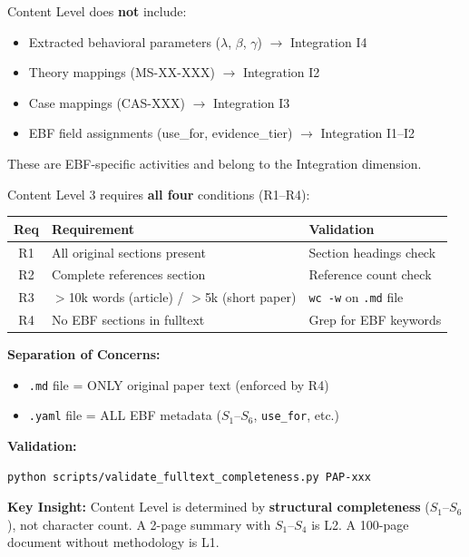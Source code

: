 \begin{tcolorbox}[colback=yellow!5!white, colframe=yellow!75!black,
    title=Note: What Content Level Does NOT Include]
Content Level does \textbf{not} include:
\begin{itemize}[nosep]
    \item Extracted behavioral parameters ($\lambda$, $\beta$, $\gamma$) $\rightarrow$ Integration I4
    \item Theory mappings (MS-XX-XXX) $\rightarrow$ Integration I2
    \item Case mappings (CAS-XXX) $\rightarrow$ Integration I3
    \item EBF field assignments (use\_for, evidence\_tier) $\rightarrow$ Integration I1--I2
\end{itemize}
These are EBF-specific activities and belong to the Integration dimension.
\end{tcolorbox}

\begin{tcolorbox}[colback=red!5!white, colframe=red!75!black,
    title=Critical: Content Level 3 Requirements (R1--R4)]
Content Level 3 requires \textbf{all four} conditions (R1--R4):

\begin{table}[H]
\centering
\begin{tabular}{@{}clp{6cm}@{}}
\toprule
\textbf{Req} & \textbf{Requirement} & \textbf{Validation} \\
\midrule
R1 & All original sections present & Section headings check \\
R2 & Complete references section & Reference count check \\
R3 & $>$10k words (article) / $>$5k (short paper) & \texttt{wc -w} on \texttt{.md} file \\
R4 & No EBF sections in fulltext & Grep for EBF keywords \\
\bottomrule
\end{tabular}
\end{table}

\textbf{Separation of Concerns:}
\begin{itemize}[nosep]
    \item \texttt{.md} file = ONLY original paper text (enforced by R4)
    \item \texttt{.yaml} file = ALL EBF metadata ($S_1$--$S_6$, \texttt{use\_for}, etc.)
\end{itemize}

\textbf{Validation:}
\begin{verbatim}
python scripts/validate_fulltext_completeness.py PAP-xxx
\end{verbatim}

\textbf{Key Insight:} Content Level is determined by \textbf{structural completeness}
($S_1$--$S_6$), not character count. A 2-page summary with $S_1$--$S_4$ is L2.
A 100-page document without methodology is L1.
\end{tcolorbox}

